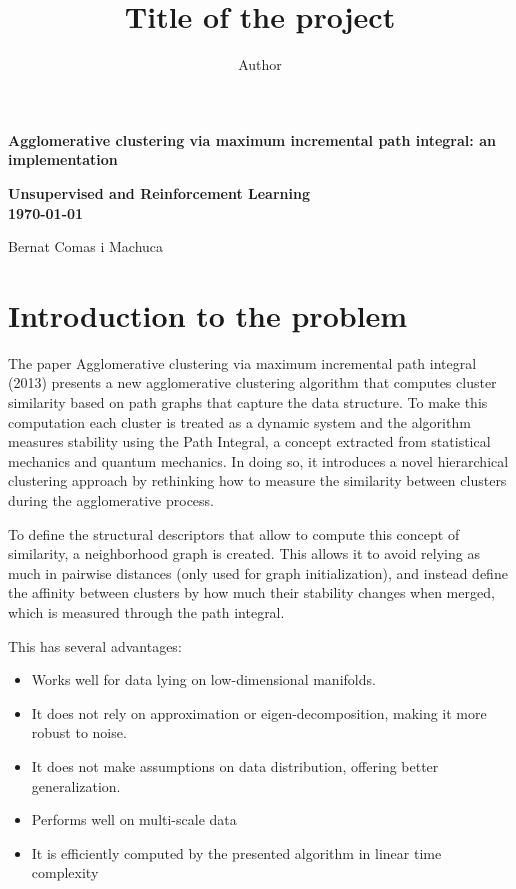 \documentclass[
	10pt,
	parskip=half-,	
	paper=a4,
	english
	]{scrartcl}
\title{Title of the project}
\author{Author}
\date{\newdateformat{monthyeardate}{%
  \monthname[\THEMONTH], \THEYEAR}}
\date{}
\begin{document}
\begin{titlepage}
    \centering
    \vspace*{\fill}

    {\Huge\bfseries Agglomerative clustering via maximum incremental path integral: an implementation}
    \vspace{1cm}
    
    {\bfseries Unsupervised and Reinforcement Learning\\} %
    \vspace{0.5cm}
    {\bfseries \today}
    \vspace{1.5cm}

    {\Large Bernat Comas i Machuca}
    \vspace{0.5cm}

    {\Large \date{}}

    \vspace*{\fill} %

\end{titlepage}

\newpage			
\tableofcontents
\newpage
\section {Introduction to the problem}

The paper Agglomerative clustering via maximum incremental path integral (2013) \cite{citation1} presents a new agglomerative clustering algorithm that computes cluster similarity based on path graphs that capture the data structure. To make this computation each cluster is treated as a dynamic system and the algorithm measures stability using the Path Integral, a concept extracted from statistical mechanics and quantum mechanics. In doing so, it introduces a novel hierarchical clustering approach by rethinking how to measure the similarity between clusters during the agglomerative process.

To define the structural descriptors that allow to compute this concept of similarity, a neighborhood graph is created. This allows it to avoid relying as much in pairwise distances (only used for graph initialization), and instead define the affinity between clusters by how much their stability changes when merged, which is measured through the path integral.

This has several advantages:

\begin{itemize}
    \item Works well for data lying on low-dimensional manifolds.
    \item It does not rely on approximation or eigen-decomposition, making it more robust to noise.
    \item It does not make assumptions on data distribution, offering better generalization.
    \item Performs well on multi-scale data
    \item It is efficiently computed by the presented algorithm in linear time complexity
\end{itemize}
\end{document}
